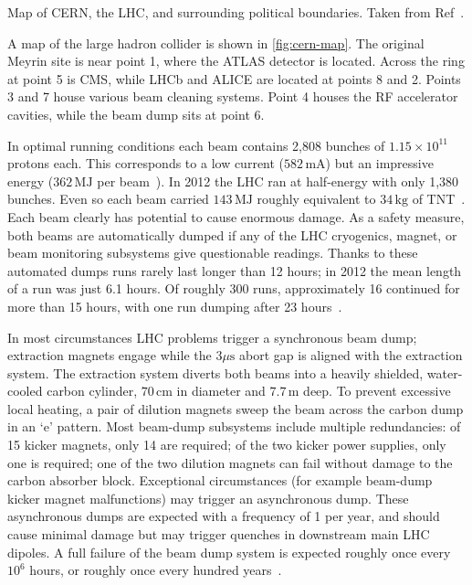 \begin{cfig}
  \caption[CERN Map]{Map of CERN, the LHC, and surrounding political boundaries. Taken from Ref~\cite{cern-map}.}
  \label{fig:cern-map}
\end{cfig}

A map of the large hadron collider is shown in \cref{fig:cern-map}.
The original Meyrin site is near point 1, where the ATLAS detector is located.
Across the ring at point 5 is CMS, while LHCb and ALICE are located at points 8 and 2.
Points 3 and 7 house various beam cleaning systems.
Point 4 houses the RF accelerator cavities, while the beam dump sits at point 6.

In optimal running conditions each beam contains 2,808 bunches of $1.15 \times 10^{11}$ protons each.
This corresponds to a low current ($582\,\text{mA}$) but an impressive energy ($362\,\text{MJ}$ per beam~\cite{lhc-machine}).
In 2012 the LHC ran at half-energy with only 1,380 bunches.
Even so each beam carried $143\,\text{MJ}$ roughly equivalent to $34\,\text{kg}$ of TNT~\cite{lhc-run1}.
Each beam clearly has potential to cause enormous damage.
As a safety measure, both beams are automatically dumped if any of the LHC cryogenics, magnet, or beam monitoring subsystems give questionable readings.
Thanks to these automated dumps runs rarely last longer than 12 hours; in 2012 the mean length of a run was just 6.1 hours.
Of roughly 300 runs, approximately 16 continued for more than 15 hours, with one run dumping after 23 hours~\cite{lhc-run1}.

In most circumstances LHC problems trigger a synchronous beam dump; extraction magnets engage while the $3 \mu\text{s}$ abort gap is aligned with the extraction system.
The extraction system diverts both beams into a heavily shielded, water-cooled carbon cylinder, $70\,\mathrm{cm}$ in diameter and $7.7\,\text{m}$ deep.
To prevent excessive local heating, a pair of dilution magnets sweep the beam across the carbon dump in an `e' pattern.
Most beam-dump subsystems include multiple redundancies: of 15 kicker magnets, only 14 are required; of the two kicker power supplies, only one is required; one of the two dilution magnets can fail without damage to the carbon absorber block.
Exceptional circumstances (for example beam-dump kicker magnet malfunctions) may trigger an asynchronous dump.
These asynchronous dumps are expected with a frequency of 1 per year, and should cause minimal damage but may trigger quenches in downstream main LHC dipoles.
A full failure of the beam dump system is expected roughly once every $10^6$ hours, or roughly once every hundred years~\cite{lhc-machine}.


